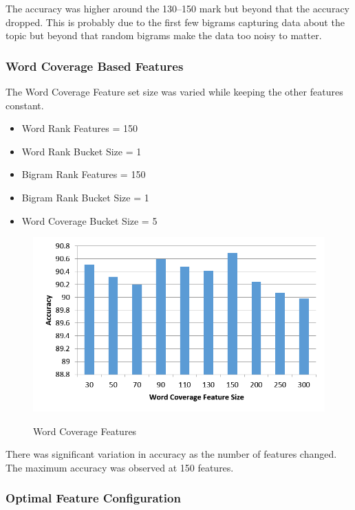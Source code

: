 \documentclass[a4paper,10pt]{report}
\begin{document}
\noindent The accuracy was higher around the 130--150 mark but beyond that the accuracy dropped. This is probably due to the first few bigrams capturing data about the topic but beyond that random bigrams make the data too noisy to matter.

\clearpage
\subsubsection{Word Coverage Based Features}

The Word Coverage Feature set size was varied while keeping the other features constant.

\begin{itemize}
\item Word Rank Features = 150
\item Word Rank Bucket Size = 1
\item Bigram Rank Features = 150
\item Bigram Rank Bucket Size = 1
\item Word Coverage Bucket Size = 5
\end{itemize}

\begin{figure}[h!]
\centering
\includegraphics[width=\textwidth]{./diagrams/wcf}\\
\caption{Word Coverage Features}
\end{figure}

\noindent There was significant variation in accuracy as the number of features changed. The maximum accuracy was observed at 150 features.

\clearpage

\subsubsection{Optimal Feature Configuration}
\end{document}
